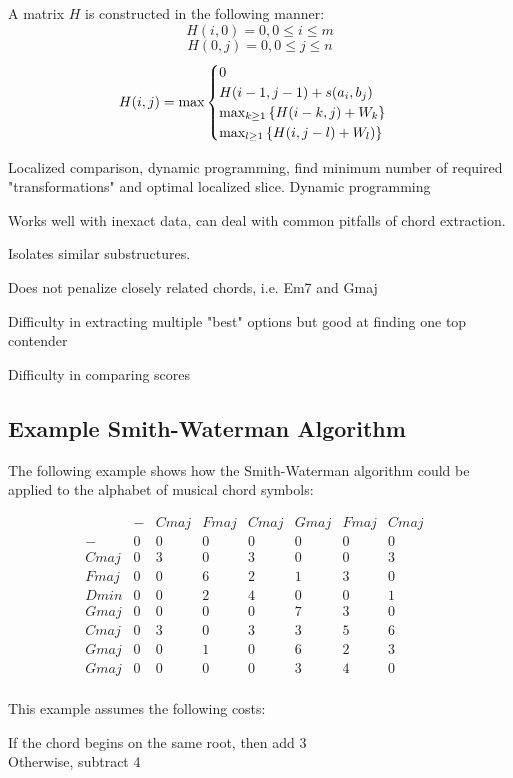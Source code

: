A matrix $H$ is constructed in the following manner:
\[ H(i,0) = 0, 0 \leq i \leq m \]
\[ H(0,j) = 0, 0 \leq j \leq n \]
\[ H(i,j) = \hbox{max} \begin{cases} 0 \\ H(i-1,j-1)+s(a_i,b_j) \\ \hbox{max}_{k \geq 1} \left\{ H(i-k,j)+W_k \right\} \\ \hbox{max}_{l \geq 1}\left\{ H(i, j-l)+W_l) \right\} \end{cases}  \]

\item Localized comparison, dynamic programming, find minimum number of required "transformations" and optimal localized slice. Dynamic programming

\item Works well with inexact data, can deal with common pitfalls of chord extraction.

\item Isolates similar substructures.

\item Does not penalize closely related chords, i.e. Em7 and Gmaj

\item Difficulty in extracting multiple "best" options but good at finding one top contender

\item Difficulty in comparing scores

\subsection{Example Smith-Waterman Algorithm}

The following example shows how the Smith-Waterman algorithm could be applied to the alphabet of musical chord symbols:

\[ \begin{array}{cccccccc} & - & Cmaj & Fmaj & Cmaj & Gmaj & Fmaj & Cmaj & \\ - & 0 & 0 & 0 & 0 & 0 & 0 & 0 & \\ Cmaj & 0 & 3 & 0 & 3 & 0 & 0 & 3 & \\ Fmaj & 0 & 0 & 6 & 2 & 1 & 3 & 0 & \\ Dmin & 0 & 0 & 2 & 4 & 0 & 0 & 1 & \\ Gmaj & 0 & 0 & 0 & 0 & 7 & 3 & 0 & \\ Cmaj & 0 & 3 & 0 & 3 & 3 & 5 & 6 & \\ Gmaj & 0 & 0 & 1 & 0 & 6 & 2 & 3 & \\ Gmaj & 0 & 0 & 0 & 0 & 3 & 4 & 0 & \\ \end{array} \]

This example assumes the following costs:

If the chord begins on the same root, then add 3 \\
Otherwise, subtract 4 \\